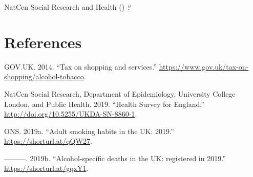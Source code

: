 \documentclass[
  11pt,
]{article}
\newlength{\cslhangindent}
\newenvironment{CSLReferences}[2] %
 {\begin{list}{}{%
  \setlength{\itemindent}{0pt}
  \setlength{\leftmargin}{0pt}
  \setlength{\parsep}{0pt}
  \ifodd #1
   \setlength{\leftmargin}{\cslhangindent}
   \setlength{\itemindent}{-1\cslhangindent}
  \fi
  \setlength{\itemsep}{#2\baselineskip}}}
 {\end{list}}
\begin{document}
NatCen Social Research and Health () \emph{?}

\newpage

\section*{References}\label{references}

\label{refs}
\begin{CSLReferences}{1}{0}
GOV.UK. 2014. {``{Tax on shopping and services}.''}
\url{https://www.gov.uk/tax-on-shopping/alcohol-tobacco}.

NatCen Social Research, Department of Epidemiology, University College
London, and Public Health. 2019. {``{Health Survey for England}.''}
\url{http://doi.org/10.5255/UKDA-SN-8860-1}.

ONS. 2019a. {``{Adult smoking habits in the UK: 2019}.''}
\url{https://shorturl.at/qQW27}.

---------. 2019b. {``{Alcohol-specific deaths in the UK: registered in
2019}.''} \url{https://shorturl.at/gqxY1}.

\end{CSLReferences}
\end{document}
